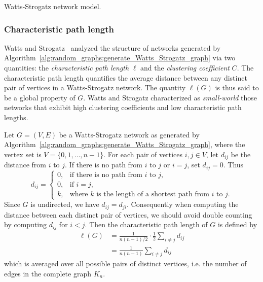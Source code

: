 \begin{algorithm}[!htbp]

\caption{Watts-Strogatz network model.}
\label{alg:random_graphs:generate_Watts_Strogatz_graph}
\end{algorithm}



\subsubsection{Characteristic path length}

Watts and Strogatz~\cite{WattsStrogatz1998} analyzed the structure of
networks generated by
Algorithm~\ref{alg:random_graphs:generate_Watts_Strogatz_graph} via
two quantities: the
\emph{characteristic path length}
$\ell$ and the
\emph{clustering coefficient}
$C$. The characteristic path length quantifies the average distance
between any distinct pair of vertices in a Watts-Strogatz network. The
quantity $\ell(G)$ is thus said to be a global property of $G$. Watts
and Strogatz characterized as \emph{small-world}
those networks that exhibit high clustering coefficients and low
characteristic path lengths.

Let $G = (V,E)$ be a Watts-Strogatz network as generated by
Algorithm~\ref{alg:random_graphs:generate_Watts_Strogatz_graph}, where
the vertex set is $V = \{0, 1, \dots, n-1\}$. For each pair of
vertices $i,j \in V$, let $d_{ij}$ be the distance from $i$ to $j$. If
there is no path from $i$ to $j$ or $i = j$, set $d_{ij} = 0$. Thus
\[
d_{ij}
=
\begin{cases}
0, & \text{if there is no path from $i$ to $j$}, \\[4pt]
0, & \text{if $i = j$}, \\[4pt]
k, & \text{where $k$ is the length of a shortest path from $i$ to $j$}.
\end{cases}
\]
Since $G$ is undirected, we have $d_{ij} = d_{ji}$. Consequently when
computing the distance between each distinct pair of vertices, we
should avoid double counting by computing $d_{ij}$ for $i < j$. Then
the characteristic path length of $G$ is defined by
\begin{equation}
\label{eqn:random_graphs:define_characteristic_path_length}
\begin{aligned}
\ell(G)
&=
\frac{1}{n(n-1)/2} \cdot \frac{1}{2} \sum_{i \neq j} d_{ij} \\[4pt]
&=
\frac{1}{n(n-1)} \sum_{i \neq j} d_{ij}
\end{aligned}
\end{equation}
which is averaged over all possible pairs of distinct vertices,
i.e. the number of edges in the complete graph
$K_n$.

